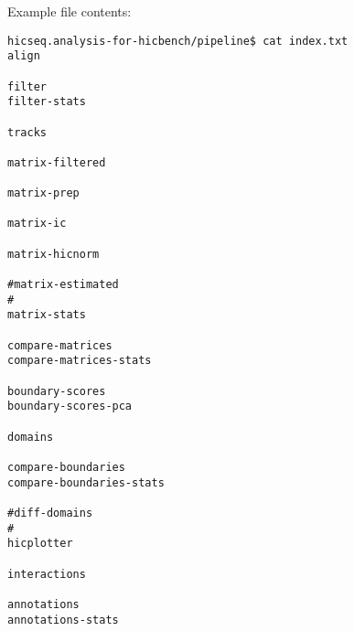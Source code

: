 \begin{enumerate}
Example  file contents:

\begin{lstlisting}
hicseq.analysis-for-hicbench/pipeline$ cat index.txt
align

filter
filter-stats

tracks

matrix-filtered

matrix-prep

matrix-ic

matrix-hicnorm

#matrix-estimated
#
matrix-stats

compare-matrices
compare-matrices-stats

boundary-scores
boundary-scores-pca

domains

compare-boundaries
compare-boundaries-stats

#diff-domains
#
hicplotter

interactions

annotations
annotations-stats
\end{lstlisting}


\end{enumerate}
